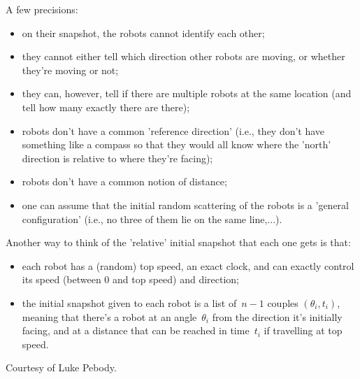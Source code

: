 \documentclass{article}
\begin{document}
A few precisions:
\begin{itemize}
\item on their snapshot, the robots cannot identify each other;
\item they cannot either tell which direction other robots are moving, or whether they're moving or not;
\item they can, however, tell if there are multiple robots at the same location (and tell how many exactly there are there);
\item robots don't have a common 'reference direction' (i.e., they don't have something like a compass so that they would all know where the 'north' direction is relative to where they're facing);
\item robots don't have a common notion of distance;
\item one can assume that the initial random scattering of the robots is a 'general configuration' (i.e., no three of them lie on the same line,...).
\end{itemize}

Another way to think of the 'relative' initial snapshot that each one gets is that:
\begin{itemize}
\item each robot has a (random) top speed, an exact clock, and can exactly control its speed (between 0 and top speed) and direction;
\item the initial snapshot given to each robot is a list of~$n-1$ couples $(\theta _i, t_i)$, meaning that there's a robot at an angle~$\theta _i$ from the direction it's initially facing, and at a distance that can be reached in time~$t_i$ if travelling at top speed.
\end{itemize}

Courtesy of Luke Pebody.

\end{document}
